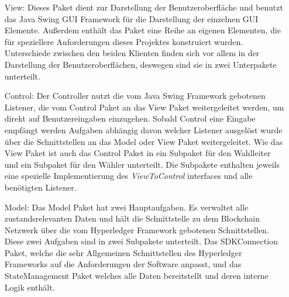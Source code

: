 \documentclass[parskip=full]{scrartcl}
\begin{document}
	\begin{itemize}
		\item[View:] Dieses Paket dient zur Darstellung der Benutzeroberfläche und benutzt das Java Swing GUI Framework für die Darstellung der einzelnen GUI Elemente. Außerdem enthält das Paket eine Reihe an eigenen Elementen, die für speziellere Anforderungen dieses Projektes konstruiert wurden. Unterschiede zwischen den beiden Klienten finden sich vor allem in der Darstellung der Benutzeroberflächen, deswegen sind sie in zwei Unterpakete unterteilt.
		\item[Control:] Der Controller nutzt die vom Java Swing Framework gebotenen Listener, die vom Control Paket an das View Paket weitergeleitet werden, um direkt auf Benutzereingaben einzugehen. Sobald Control eine Eingabe empfängt werden Aufgaben abhängig davon welcher Listener ausgelöst wurde über die Schnittstellen an das Model oder View Paket weitergeleitet. Wie das View Paket ist auch das Control Paket in ein Subpaket für den Wahlleiter und ein Subpaket für den Wähler unterteilt. Die Subpakete enthalten jeweils eine spezielle Implementierung des \textit{ViewToControl} interfaces und alle benötigten Listener.
		\item[Model:] Das Model Paket hat zwei Hauptaufgaben. Es verwaltet alle zustandsrelevanten Daten und hält die Schnittstelle zu dem Blockchain Netzwerk über die vom Hyperledger Framework gebotenen Schnittstellen. Diese zwei Aufgaben sind in zwei Subpakete unterteilt. Das SDKConnection Paket, welche die sehr Allgemeinen Schnittstellen des Hyperledger Frameworks auf die Anforderungen der Software anpasst, und das StateManagement Paket welches alle Daten bereitstellt und deren interne Logik enthält.   
	\end{itemize} 
	
	\newpage
\end{document}
